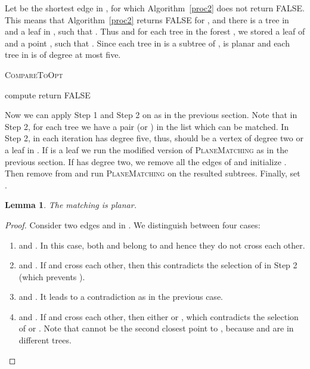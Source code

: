 \documentclass[11pt,a4paper]{article}
\newtheorem{lemma}{Lemma}
\begin{document}
Let  be the shortest edge in , for which Algorithm~\ref{proc2} does not return FALSE. This means that Algorithm~\ref{proc2} returns FALSE for , and there is a tree  in  and a leaf  in , such that . Thus  and for each tree  in the forest , we stored a leaf  of  and a point , such that . Since each tree in  is a subtree of ,  is planar and each tree in  is of degree at most five. 


\begin{algorithm}                      \caption{{\scshape CompareToOpt}}          \label{proc2} 
\begin{algorithmic}[1]

  \State compute  
		\State return {FALSE} \EndIf
  \State 
	\State 
	
  \If {}
				\State {}
			\Else
				  \EndIf
  \Else 
				\State {}
			\Else
				  \EndIf
  \EndIf \EndIf
	\EndFor
\State \Return 
	
\end{algorithmic}
\end{algorithm}



Now we can apply Step 1 and Step 2 on  as in the previous section. Note that in Step 2, for each tree  we have a pair  (or ) in the list  which can be matched. In Step 2, in each iteration  has degree five, thus,  should be a vertex
of degree two or a leaf in . If  is a leaf we run the modified version of {\scshape PlaneMatching} as in the previous section. If  has degree two, we remove all the edges of  and initialize . Then remove  from  and run {\scshape PlaneMatching} on the resulted subtrees. Finally, set .

\begin{lemma}
\label{planarity}
 The matching  is planar.
\end{lemma}
\begin{proof}
Consider two edges  and  in . We distinguish between four cases:
\begin{enumerate}
   \item  and . In this case, both  and  belong to  and hence they do not cross each other.
  \item  and . If  and  cross each other, then this contradicts the selection of  in Step 2 (which prevents ).
  \item  and . It leads to a contradiction as in the previous case.
  \item  and . If  and  cross each other, then either  or , which contradicts the selection of  or . Note that  cannot be the second closest point to , because  and  are in different trees. 
\end{enumerate} 
\end{proof}
\end{document}
